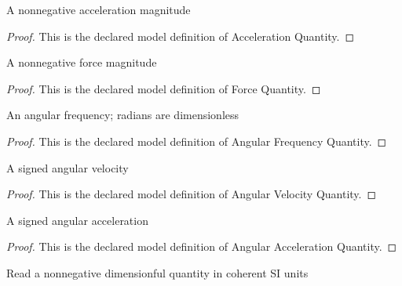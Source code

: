 \begin{definition}
  \label{def:physics:phyx-mini-0234:phyxminiproblems-problemphyxmini0234-accelerationquantity}
  A nonnegative acceleration magnitude
\end{definition}
\begin{proof}
  This is the declared model definition of Acceleration Quantity.
\end{proof}
\begin{definition}
  \label{def:physics:phyx-mini-0234:phyxminiproblems-problemphyxmini0234-forcequantity}
  A nonnegative force magnitude
\end{definition}
\begin{proof}
  This is the declared model definition of Force Quantity.
\end{proof}
\begin{definition}
  \label{def:physics:phyx-mini-0234:phyxminiproblems-problemphyxmini0234-angularfrequencyquantity}
  An angular frequency; radians are dimensionless
\end{definition}
\begin{proof}
  This is the declared model definition of Angular Frequency Quantity.
\end{proof}
\begin{definition}
  \label{def:physics:phyx-mini-0234:phyxminiproblems-problemphyxmini0234-angularvelocityquantity}
  A signed angular velocity
\end{definition}
\begin{proof}
  This is the declared model definition of Angular Velocity Quantity.
\end{proof}
\begin{definition}
  \label{def:physics:phyx-mini-0234:phyxminiproblems-problemphyxmini0234-angularaccelerationquantity}
  A signed angular acceleration
\end{definition}
\begin{proof}
  This is the declared model definition of Angular Acceleration Quantity.
\end{proof}
\begin{definition}
  \label{def:physics:phyx-mini-0234:phyxminiproblems-problemphyxmini0234-nonnegativesireadout}
  Read a nonnegative dimensionful quantity in coherent SI units
\end{definition}

